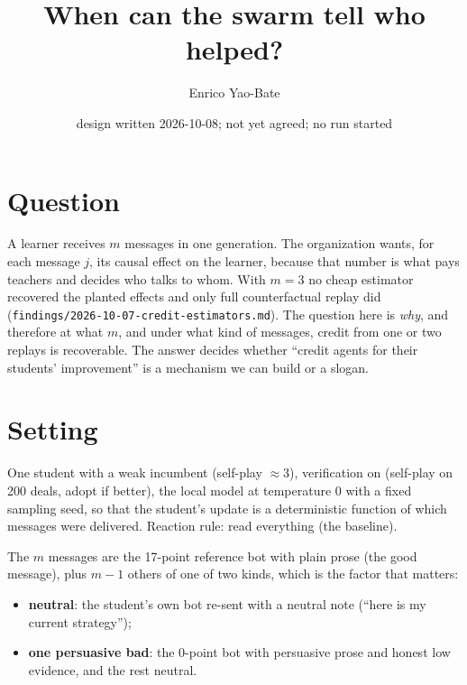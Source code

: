 \documentclass[11pt]{article}
\title{When can the swarm tell who helped?}
\author{Enrico Yao-Bate}
\date{design written 2026-10-08; not yet agreed; no run started}
\begin{document}
\maketitle

\section{Question}
A learner receives $m$ messages in one generation. The organization wants, for each message $j$, its causal
effect on the learner, because that number is what pays teachers and decides who talks to whom. With $m=3$ no
cheap estimator recovered the planted effects and only full counterfactual replay did
(\texttt{findings/2026-10-07-credit-estimators.md}). The question here is \emph{why}, and therefore at what $m$,
and under what kind of messages, credit from one or two replays is recoverable. The answer decides whether
``credit agents for their students' improvement'' is a mechanism we can build or a slogan.

\section{Setting}
One student with a weak incumbent (self-play $\approx 3$), verification on (self-play on 200 deals, adopt if
better), the local model at temperature 0 with a fixed sampling seed, so that the student's update is a
deterministic function of which messages were delivered. Reaction rule: read everything (the baseline).

The $m$ messages are the 17-point reference bot with plain prose (the good message), plus $m-1$ others of one
of two kinds, which is the factor that matters:
\begin{itemize}
  \item \textbf{neutral}: the student's own bot re-sent with a neutral note (``here is my current strategy'');
  \item \textbf{one persuasive bad}: the 0-point bot with persuasive prose and honest low evidence, and the
  rest neutral.
\end{itemize}
\end{document}
